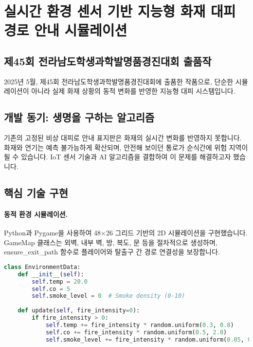 \section{실시간 환경 센서 기반 지능형 화재 대피 경로 안내 시뮬레이션}

\subsection{제45회 전라남도학생과학발명품경진대회 출품작}

2025년 5월, 제45회 전라남도학생과학발명품경진대회에 출품한 작품으로, 단순한 시뮬레이션이 아니라 실제 화재 상황의 동적 변화를 반영한 지능형 대피 시스템입니다.

\subsection{개발 동기: 생명을 구하는 알고리즘}

기존의 고정된 비상 대피로 안내 표지판은 화재의 실시간 변화를 반영하지 못합니다. 화재와 연기는 예측 불가능하게 확산되며, 안전해 보이던 통로가 순식간에 위험 지역이 될 수 있습니다. IoT 센서 기술과 AI 알고리즘을 결합하여 이 문제를 해결하고자 했습니다.

\subsection{핵심 기술 구현}

\paragraph{동적 환경 시뮬레이션.}
Python과 Pygame을 사용하여 48×26 그리드 기반의 2D 시뮬레이션을 구현했습니다. GameMap 클래스는 외벽, 내부 벽, 방, 복도, 문 등을 절차적으로 생성하며, ensure\_exit\_path 함수로 플레이어와 탈출구 간 경로 연결성을 보장합니다.

\begin{lstlisting}[language=Python, basicstyle=\footnotesize\ttfamily]
class EnvironmentData:
    def __init__(self):
        self.temp = 20.0
        self.co = 5
        self.smoke_level = 0  # Smoke density (0-10)
        
    def update(self, fire_intensity=0):
        if fire_intensity > 0:
            self.temp += fire_intensity * random.uniform(0.3, 0.8)
            self.co += fire_intensity * random.uniform(0.5, 2.0)
            self.smoke_level += fire_intensity * random.uniform(0.05, 0.2)
\end{lstlisting}

